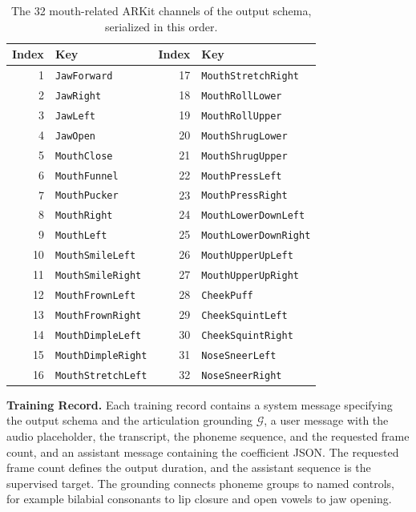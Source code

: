 \begin{table}[h]
\centering
\caption{The 32 mouth-related ARKit channels of the output schema, serialized in this order.}
\label{tab:schema}
\small
\begin{tabular}{r l r l}
\toprule
Index & Key & Index & Key \\
\midrule
1 & \texttt{JawForward} & 17 & \texttt{MouthStretchRight} \\
2 & \texttt{JawRight} & 18 & \texttt{MouthRollLower} \\
3 & \texttt{JawLeft} & 19 & \texttt{MouthRollUpper} \\
4 & \texttt{JawOpen} & 20 & \texttt{MouthShrugLower} \\
5 & \texttt{MouthClose} & 21 & \texttt{MouthShrugUpper} \\
6 & \texttt{MouthFunnel} & 22 & \texttt{MouthPressLeft} \\
7 & \texttt{MouthPucker} & 23 & \texttt{MouthPressRight} \\
8 & \texttt{MouthRight} & 24 & \texttt{MouthLowerDownLeft} \\
9 & \texttt{MouthLeft} & 25 & \texttt{MouthLowerDownRight} \\
10 & \texttt{MouthSmileLeft} & 26 & \texttt{MouthUpperUpLeft} \\
11 & \texttt{MouthSmileRight} & 27 & \texttt{MouthUpperUpRight} \\
12 & \texttt{MouthFrownLeft} & 28 & \texttt{CheekPuff} \\
13 & \texttt{MouthFrownRight} & 29 & \texttt{CheekSquintLeft} \\
14 & \texttt{MouthDimpleLeft} & 30 & \texttt{CheekSquintRight} \\
15 & \texttt{MouthDimpleRight} & 31 & \texttt{NoseSneerLeft} \\
16 & \texttt{MouthStretchLeft} & 32 & \texttt{NoseSneerRight} \\
\bottomrule
\end{tabular}
\end{table}

\noindent\textbf{Training Record.}\quad
Each training record contains a system message specifying the output schema and the articulation grounding $\mathcal{G}$, a user message with the audio placeholder, the transcript, the phoneme sequence, and the requested frame count, and an assistant message containing the coefficient JSON. The requested frame count defines the output duration, and the assistant sequence is the supervised target. The grounding connects phoneme groups to named controls, for example bilabial consonants to lip closure and open vowels to jaw opening.

